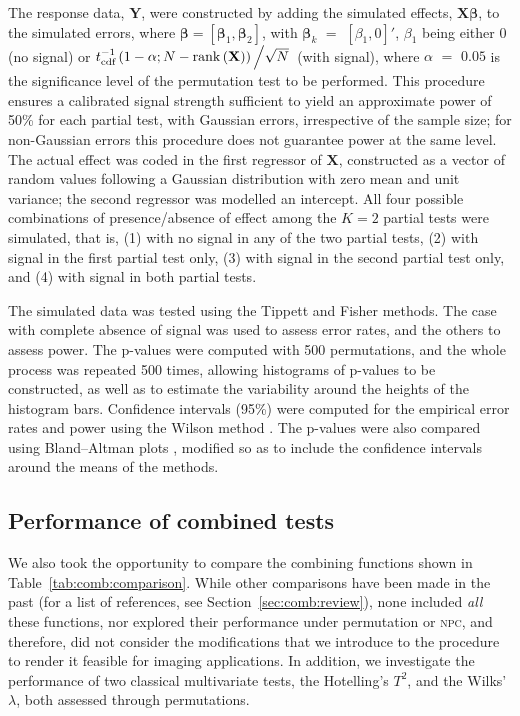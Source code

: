 The response data, $\mathbf{Y}$, were constructed by adding the simulated effects, $\mathbf{X}\boldsymbol{\beta}$, to the simulated errors, where $\boldsymbol{\beta} = \left[\boldsymbol{\beta}_1,\boldsymbol{\beta}_2\right]$, with $\boldsymbol{\beta}_k$ $=$ $[\beta_1, 0]'$, $\beta_1$ being either 0 (no signal) or $t^{-1}_{\text{cdf}}\left(1-\alpha ; N-\mathrm{rank}\left(\mathbf{X}\right)\right)\left/\sqrt{N}\right.$ (with signal), where $\alpha$ $=$ $0.05$ is the significance level of the permutation test to be performed. This procedure ensures a calibrated signal strength sufficient to yield an approximate power of 50\% for each partial test, with Gaussian errors, irrespective of the sample size; for non-Gaussian errors this procedure does not guarantee power at the same level. The actual effect was coded in the first regressor of $\mathbf{X}$, constructed as a vector of random values following a Gaussian distribution with zero mean and unit variance; the second regressor was modelled an intercept. All four possible combinations of presence/absence of effect among the $K=2$ partial tests were simulated, that is, (1) with no signal in any of the two partial tests, (2) with signal in the first partial test only, (3) with signal in the second partial test only, and (4) with signal in both partial tests.

The simulated data was tested using the Tippett and Fisher methods. The case with complete absence of signal was used to assess error rates, and the others to assess power. The p-values were computed with 500 permutations, and the whole process was repeated 500 times, allowing histograms of p-values to be constructed, as well as to estimate the variability around the heights of the histogram bars. Confidence intervals (95\%) were computed for the empirical error rates and power using the Wilson method \citep{Wilson1927}. The p-values were also compared using Bland--Altman plots \citep{Bland1986}, modified so as to include the confidence intervals around the means of the methods.

\subsection{Performance of combined tests}

We also took the opportunity to compare the combining functions shown in Table~\ref{tab:comb:comparison}. While other comparisons have been made in the past (for a list of references, see Section~\ref{sec:comb:review}), none included \emph{all} these functions, nor explored their performance under permutation or \textsc{npc}, and therefore, did not consider the modifications that we introduce to the procedure to render it feasible for imaging applications. In addition, we investigate the performance of two classical multivariate tests, the Hotelling's $T^2$, and the Wilks' $\lambda$, both assessed through permutations.

